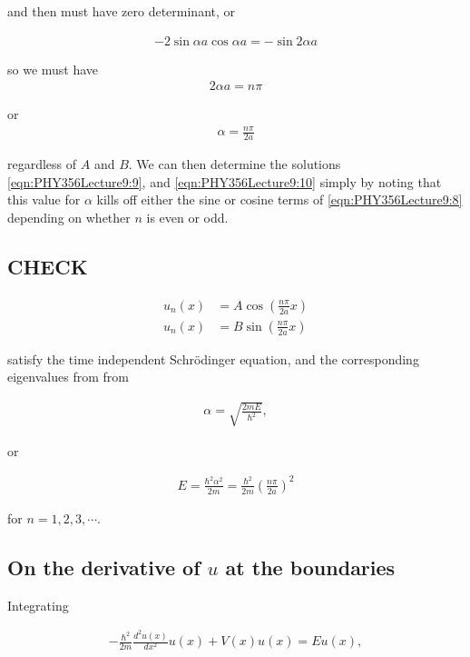 and then must have zero determinant, or

\begin{align}\label{eqn:PHY356Lecture9:11}
-2 \sin\alpha a \cos\alpha a = -\sin 2 \alpha a
\end{align}

so we must have
\begin{align*}
2 \alpha a = n \pi
\end{align*}

or
\begin{align*}
\alpha = \frac{n \pi}{2a}
\end{align*}

regardless of $A$ and $B$.  We can then determine the solutions \ref{eqn:PHY356Lecture9:9}, and \ref{eqn:PHY356Lecture9:10} simply by noting that this value for $\alpha$ kills off either the sine or cosine terms of \ref{eqn:PHY356Lecture9:8} depending on whether $n$ is even or odd.

\subsection{CHECK}

\begin{align*}
u_n(x) &= A \cos \left( \frac{n \pi}{2 a} x \right) \\
u_n(x) &= B \sin \left( \frac{n \pi}{2 a} x \right)
\end{align*}

satisfy the time independent Schr\"{o}dinger equation, and the corresponding eigenvalues from from

\begin{align*}
\alpha = \sqrt{\frac{2 m E}{\hbar^2}},
\end{align*}

or

\begin{align*}
E = \frac{\hbar^2 \alpha^2}{2m} = \frac{\hbar^2}{2m} \left( \frac{n \pi}{2a} \right)^2
\end{align*}

for $n = 1, 2, 3, \cdots$.

\subsection{On the derivative of \texorpdfstring{$u$}{u} at the boundaries}

Integrating

\begin{align}\label{eqn:PHY356Lecture9:20}
-\frac{\hbar^2 }{2m} \frac{d^2 u(x)}{dx^2} u(x) + V(x) u(x) = E u(x),
\end{align}

